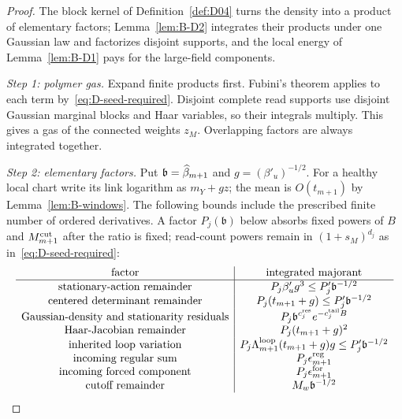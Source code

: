 \begin{proof}
The block kernel of Definition~\ref{def:D04} turns the density into a product of elementary factors; Lemma~\ref{lem:B-D2} integrates their products under one Gaussian law and factorizes disjoint supports, and the local energy of Lemma~\ref{lem:B-D1} pays for the large-field components.

\emph{Step 1: polymer gas.} Expand finite products first. Fubini's theorem applies to each term by~\eqref{eq:D-seed-required}. Disjoint complete read supports use disjoint Gaussian marginal blocks and Haar variables, so their integrals multiply. This gives a gas of the connected weights $z_M$. Overlapping factors are always integrated together.

\emph{Step 2: elementary factors.} Put $\mathfrak b=\widehat{\beta}_{m+1}$ and $g=(\beta'_u)^{-1/2}$. For a healthy local chart write its link logarithm as $m_Y+gz$; the mean is $O(t_{m+1})$ by Lemma~\ref{lem:B-windows}. The following bounds include the prescribed finite number of ordered derivatives. A factor $P_j(\mathfrak b)$ below absorbs fixed powers of $B$ and $M^{\mathrm{cut}}_{m+1}$ after the ratio is fixed; read-count powers remain in $(1+s_M)^{d_j}$ as in~\eqref{eq:D-seed-required}:
\begin{equation}\label{eq:D-factor-rates}
\begin{array}{c|c}
\text{factor}&\text{integrated majorant}\\\hline
\text{stationary-action remainder}&P_j\beta'_u g^3\le P'_j\mathfrak b^{-1/2}\\
\text{centered determinant remainder}&P_j(t_{m+1}+g)\le P'_j\mathfrak b^{-1/2}\\
\text{Gaussian-density and stationarity residuals}&P_j\mathfrak b^{c_j^{\rm res}}e^{-c_j^{\rm tail}B}\\
\text{Haar-Jacobian remainder}&P_j(t_{m+1}+g)^2\\
\text{inherited loop variation}&P_j\Lambda_{m+1}^{\rm loop}(t_{m+1}+g)g\le P'_j\mathfrak b^{-1/2}\\
\text{incoming regular sum}&P_j\epsilon_{m+1}^{\rm reg}\\
\text{incoming forced component}&P_j\epsilon_{m+1}^{\rm for}\\
\text{cutoff remainder}&M_w\mathfrak b^{-1/2}
\end{array}
\end{equation}

\end{proof}
